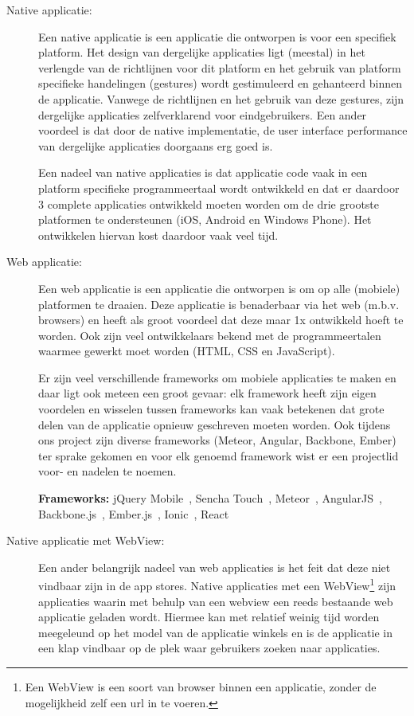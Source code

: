 \begin{description}
\item[Native applicatie:] Een native applicatie is een applicatie die ontworpen is voor een specifiek platform. Het design van dergelijke applicaties ligt (meestal) in het verlengde van de richtlijnen voor dit platform en het gebruik van platform specifieke handelingen (gestures) wordt gestimuleerd en gehanteerd binnen de applicatie. Vanwege de richtlijnen en het gebruik van deze gestures, zijn dergelijke applicaties zelfverklarend voor eindgebruikers. Een ander voordeel is dat door de native implementatie, de user interface performance van dergelijke applicaties doorgaans erg goed is.

Een nadeel van native applicaties is dat applicatie code vaak in een platform specifieke programmeertaal wordt ontwikkeld en dat er daardoor 3 complete applicaties ontwikkeld moeten worden om de drie grootste platformen te ondersteunen (iOS, Android en Windows Phone). Het ontwikkelen hiervan kost daardoor vaak veel tijd.
    
\item[Web applicatie:]
Een web applicatie is een applicatie die ontworpen is om op alle (mobiele) platformen te draaien. Deze applicatie is benaderbaar via het web (m.b.v. browsers) en heeft als groot voordeel dat deze maar 1x ontwikkeld hoeft te worden. Ook zijn veel ontwikkelaars bekend met de programmeertalen waarmee gewerkt moet worden (HTML, CSS en JavaScript).
    
Er zijn veel verschillende frameworks om mobiele applicaties te maken en daar ligt ook meteen een groot gevaar: elk framework heeft zijn eigen voordelen en wisselen tussen frameworks kan vaak betekenen dat grote delen van de applicatie opnieuw geschreven moeten worden. Ook tijdens ons project zijn diverse frameworks (Meteor, Angular, Backbone, Ember) ter sprake gekomen en voor elk genoemd framework wist er een projectlid voor- en nadelen te noemen.
    
\textbf{Frameworks:} jQuery Mobile~\cite{jq-mobile}, Sencha Touch~\cite{sencha}, Meteor~\cite{meteor}, AngularJS~\cite{angular}, Backbone.js~\cite{backbone}, Ember.js~\cite{ember}, Ionic~\cite{ionic}, React~\cite{React}
    
\item[Native applicatie met WebView:] Een ander belangrijk nadeel van web applicaties is het feit dat deze niet vindbaar zijn in de app stores. Native applicaties met een WebView\footnote{Een WebView is een soort van browser binnen een applicatie, zonder de mogelijkheid zelf een url in te voeren.} zijn applicaties waarin met behulp van een webview een reeds bestaande web applicatie geladen wordt. Hiermee kan met relatief weinig tijd worden meegeleund op het model van de applicatie winkels en is de applicatie in een klap vindbaar op de plek waar gebruikers zoeken naar applicaties.
    

\end{description}
